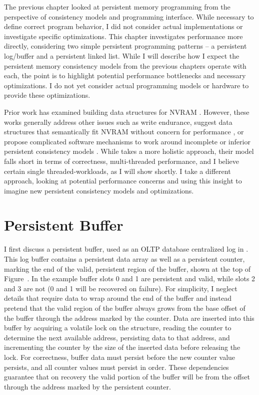 The previous chapter looked at persistent memory programming from the perspective of consistency models and programming interface.
While necessary to define correct program behavior, I did not consider actual implementations or investigate specific optimizations.
This chapter investigates performance more directly, considering two simple persistent programming patterns -- a persistent log/buffer and a persistent linked list.
While I will describe how I expect the persistent memory consistency models from the previous chapters operate with each, the point is to highlight potential performance bottlenecks and necessary optimizations.
I do not yet consider actual programming models or hardware to provide these optimizations.

Prior work has examined building data structures for NVRAM .
However, these works generally address other issues such as write endurance, suggest data structures that semantically fit NVRAM without concern for performance , or propose complicated software mechanisms to work around incomplete or inferior persistent consistency models .
While  takes a more holistic approach, their model falls short in terms of correctness, multi-threaded performance, and I believe certain single threaded-workloads, as I will show shortly.
I take a different approach, looking at potential performance concerns and using this insight to imagine new persistent consistency models and optimizations.

\section{Persistent Buffer}
\label{sec:PMC_patterns:Buffer}





I first discuss a persistent buffer, used as an OLTP database centralized log in .
This log buffer contains a persistent data array as well as a persistent counter, marking the end of the valid, persistent region of the buffer, shown at the top of Figure~.
In the example buffer slots 0 and 1 are persistent and valid, while slots 2 and 3 are not (0 and 1 will be recovered on failure).
For simplicity, I neglect details that require data to wrap around the end of the buffer and instead pretend that the valid region of the buffer always grows from the base offset of the buffer through the address marked by the counter.
Data are inserted into this buffer by acquiring a volatile lock on the structure, reading the counter to determine the next available address, persisting data to that address, and incrementing the counter by the size of the inserted data before releasing the lock.
For correctness, buffer data must persist before the new counter value persists, and all counter values must persist in order.
These dependencies guarantee that on recovery the valid portion of the buffer will be from the offset through the address marked by the persistent counter.

